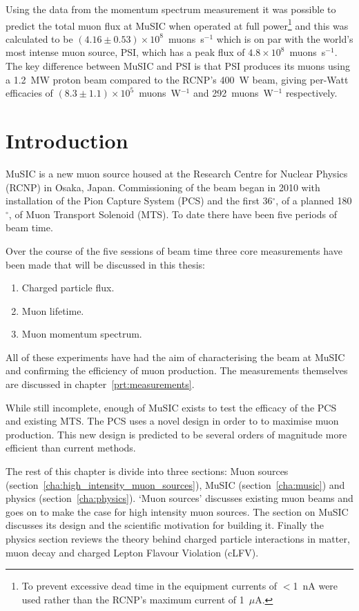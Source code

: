 Using the data from the momentum spectrum measurement it was possible to predict the total muon flux at MuSIC when operated at full power\footnote{To prevent excessive dead time in the equipment currents of \(<\)1~nA were used rather than the RCNP's maximum current of 1~\(\mu\)A.} and this was calculated to be \((4.16\pm0.53)\times10^8\)~muons~s\(^{-1}\) which is on par with the world's most intense muon source, PSI, which has a peak flux of \(4.8\times10^8\)~muons~s\(^{-1}\). The key difference between MuSIC and PSI is that PSI produces its muons using a 1.2~MW proton beam compared to the RCNP's 400~W beam, giving per-Watt efficacies of \((8.3\pm1.1)\times10^5\)~muons~W\(^{-1}\) and 292~muons~W\(^{-1}\) respectively.

\chapter{Introduction} %
\label{prt:introduction}
MuSIC is a new muon source housed at the Research Centre for Nuclear Physics (RCNP) in Osaka, Japan. Commissioning of the beam began in 2010 with installation of the Pion Capture System (PCS) and the first 36\(^{\circ}\), of a planned 180\(^{\circ}\), of Muon Transport Solenoid (MTS). To date there have been five periods of beam time.

Over the course of the five sessions of beam time three core measurements have been made that will be discussed in this thesis:
\begin{enumerate}
  \item Charged particle flux.
  \item Muon lifetime.
  \item Muon momentum spectrum.
\end{enumerate}
All of these experiments have had the aim of characterising the beam at MuSIC and confirming the efficiency of muon production. The measurements themselves are discussed in chapter~\ref{prt:measurements}.

While still incomplete, enough of MuSIC exists to test the efficacy of the PCS and existing MTS. The PCS uses a novel design in order to to maximise muon production. This new design is predicted to be several orders of magnitude more efficient than current methods.

The rest of this chapter is divide into three sections: Muon sources (section~\ref{cha:high_intensity_muon_sources}), MuSIC (section~\ref{cha:music}) and physics (section~\ref{cha:physics}). `Muon sources' discusses existing muon beams and goes on to make the case for high intensity muon sources. The section on MuSIC discusses its design and the scientific motivation for building it. Finally the physics section reviews the theory behind charged particle interactions in matter, muon decay and charged Lepton Flavour Violation (cLFV).

